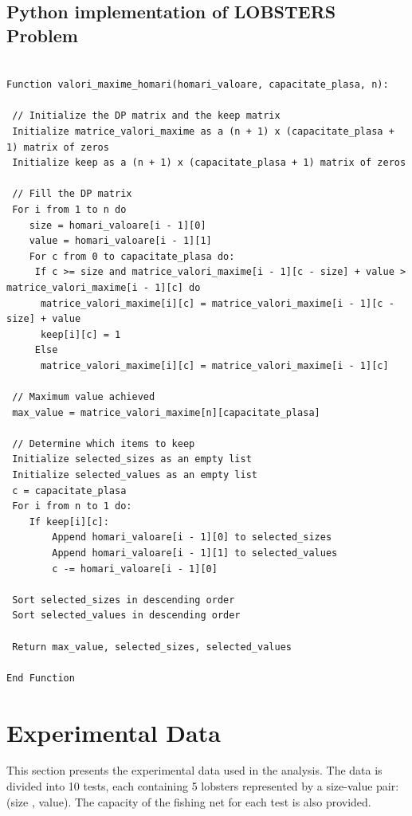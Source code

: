 \documentclass{article}%
\begin{document}
 \vspace*{\fill}
    \subsection{Python implementation of LOBSTERS Problem}
    \vspace{1cm}
\begin{verbatim}
                        
Function valori_maxime_homari(homari_valoare, capacitate_plasa, n):

 // Initialize the DP matrix and the keep matrix
 Initialize matrice_valori_maxime as a (n + 1) x (capacitate_plasa + 1) matrix of zeros
 Initialize keep as a (n + 1) x (capacitate_plasa + 1) matrix of zeros
    
 // Fill the DP matrix
 For i from 1 to n do
    size = homari_valoare[i - 1][0]
    value = homari_valoare[i - 1][1]
    For c from 0 to capacitate_plasa do:
     If c >= size and matrice_valori_maxime[i - 1][c - size] + value > matrice_valori_maxime[i - 1][c] do
      matrice_valori_maxime[i][c] = matrice_valori_maxime[i - 1][c - size] + value
      keep[i][c] = 1
     Else
      matrice_valori_maxime[i][c] = matrice_valori_maxime[i - 1][c]
    
 // Maximum value achieved
 max_value = matrice_valori_maxime[n][capacitate_plasa]
    
 // Determine which items to keep
 Initialize selected_sizes as an empty list
 Initialize selected_values as an empty list
 c = capacitate_plasa
 For i from n to 1 do:
    If keep[i][c]:
        Append homari_valoare[i - 1][0] to selected_sizes
        Append homari_valoare[i - 1][1] to selected_values
        c -= homari_valoare[i - 1][0]

 Sort selected_sizes in descending order
 Sort selected_values in descending order

 Return max_value, selected_sizes, selected_values

End Function
\end{verbatim}

 \vspace*{\fill}
\newpage%

 \vspace*{\fill}
   \section{Experimental Data}
\vspace{0.5cm}
This section presents the experimental data used in the analysis. The data is divided into 10 tests, each containing 5 lobsters represented by a size-value pair: (size , value). The capacity of the fishing net for each test is also provided.
\end{document}
